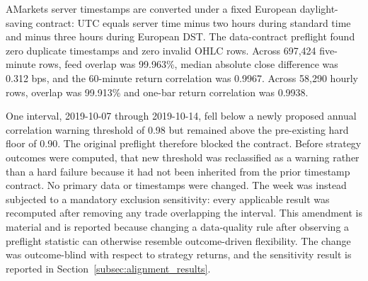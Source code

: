 AMarkets server timestamps are converted under a fixed European daylight-saving contract: UTC equals server time minus two hours during standard time and minus three hours during European DST. The data-contract preflight found zero duplicate timestamps and zero invalid OHLC rows. Across 697,424 five-minute rows, feed overlap was 99.963\%, median absolute close difference was 0.312 bps, and the 60-minute return correlation was 0.9967. Across 58,290 hourly rows, overlap was 99.913\% and one-bar return correlation was 0.9938.

One interval, 2019-10-07 through 2019-10-14, fell below a newly proposed annual correlation warning threshold of 0.98 but remained above the pre-existing hard floor of 0.90. The original preflight therefore blocked the contract. Before strategy outcomes were computed, that new threshold was reclassified as a warning rather than a hard failure because it had not been inherited from the prior timestamp contract. No primary data or timestamps were changed. The week was instead subjected to a mandatory exclusion sensitivity: every applicable result was recomputed after removing any trade overlapping the interval. This amendment is material and is reported because changing a data-quality rule after observing a preflight statistic can otherwise resemble outcome-driven flexibility. The change was outcome-blind with respect to strategy returns, and the sensitivity result is reported in Section~\ref{subsec:alignment_results}.

